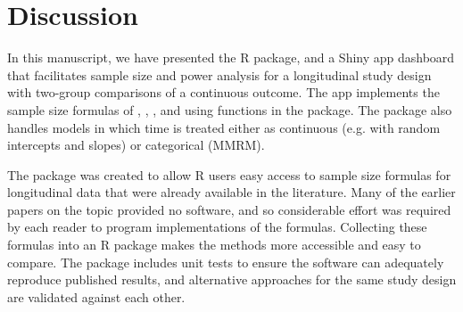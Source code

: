 \section{Discussion}
\label{sec4}
In this manuscript, we have presented the  R package, and a Shiny app dashboard that facilitates sample size and power analysis for a longitudinal study design with two-group comparisons of a continuous outcome. The app implements the sample size formulas of \cite{Liu_Liang(1997)}, \cite{Diggle_Liang_Zeger(1994),Diggle_etal(2002)}, \cite{Lu_Luo_Chen(2008)}, and \cite{Ard_Edland(2011)} using functions in the  package. The package also handles models in which time is treated either as continuous (e.g. with random intercepts and slopes) or categorical (MMRM). 

%
%

The  package was created to allow R users easy access to sample size formulas for longitudinal data that were already available in the literature. Many of the earlier papers on the topic provided no software, and so considerable effort was required by each reader to program implementations of the formulas. Collecting these formulas into an R package makes the methods more accessible and easy to compare. The package includes unit tests to ensure the software can adequately reproduce published results, and alternative approaches for the same study design are validated against each other.

